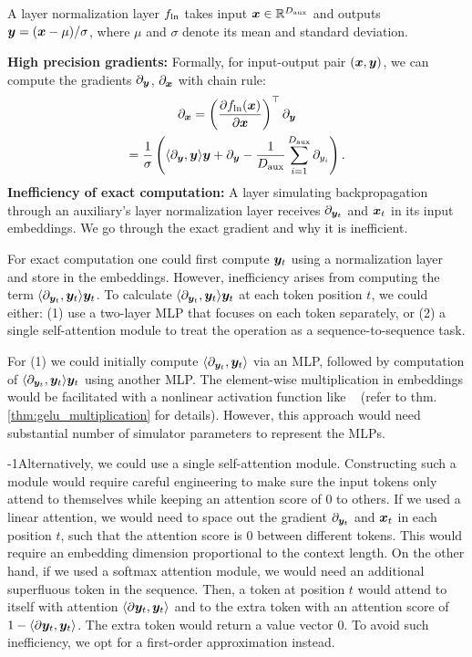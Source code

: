 \begin{definition}
     A layer normalization layer $f_{\text{ln}}$  takes input ${\bm{x}}\in\mathbb{R}^{D_{\text{aux}}}$ and outputs ${\bm{y}} = ({\bm{x}} - \mu) / \sigma$, where $\mu$ and $\sigma$ denote its mean and standard deviation.
\end{definition}
\textbf{High precision gradients:} 
Formally, for input-output pair $({\bm{x}}, {\bm{y}})$, we can compute the  gradients $\partial_{{\bm{y}}}$, $\partial_{{\bm{x}}}$ with  chain rule:
\begin{gather}
    \partial_{{\bm{x}}} = \left(\frac{\partial f_{\text{ln}} ({\bm{x}})}{\partial {\bm{x}}} \right)^{\top} \partial_{{\bm{y}}}  \nonumber \\= \frac{1}{\sigma} \left(  \langle \partial_{{\bm{y}}}, {\bm{y}} \rangle {\bm{y}} + \partial_{{\bm{y}}} - \frac{1}{D_{\text{aux}}} \sum_{i=1}^{D_{\text{aux}}} \partial_{y_i} \right). \label{eq:ln_informal}
\end{gather}
\textbf{Inefficiency of exact computation:} 
A \simulator{} layer simulating backpropagation through an auxiliary's layer normalization layer receives  $\partial_{{{\bm{y}}}_t}$ and ${\bm{x}}_t$ in its input embeddings. We go through the exact gradient and why it is inefficient.

For exact computation one could first compute ${\bm{y}}_t$ using a normalization layer and store in the embeddings. However, inefficiency arises from computing the term  $\langle \partial_{{{{\bm{y}}}_t}}, {\bm{y}}_t \rangle {\bm{y}}_t$.
To calculate $\langle \partial_{{{{\bm{y}}}_t}}, {\bm{y}}_t \rangle {\bm{y}}_t$ at each token position $t$, we could either: (1) use a two-layer MLP that focuses on each token separately, or (2) a single self-attention module to treat the operation as a sequence-to-sequence task. 

For (1) we could initially compute $\langle \partial_{{{\bm{y}}}_t}, {\bm{y}}_t \rangle$ via an MLP, followed by computation of $\langle \partial_{{{\bm{y}}}_t}, {\bm{y}}_t \rangle {\bm{y}}_t$ using another MLP. The element-wise multiplication in embeddings would be facilitated with a nonlinear activation function like \gelu{}~\citep{akyurek2022learning} (refer to thm. \ref{thm:gelu_multiplication} for details). However, this approach would need  substantial number of simulator parameters to represent the MLPs.

\looseness-1Alternatively, we could  use a single self-attention module. Constructing such a module would require careful engineering to make sure the input tokens only attend to themselves while keeping an attention score of $0$ to others. If we used a linear attention, we would need to space out the gradient $\partial_{{{\bm{y}}}_t}$ and ${\bm{x}}_t$ in each position $t$, such that the attention score is $0$ between different tokens. This would require an embedding dimension proportional to the context length. 
On the other hand, if we used a softmax attention module, we would need an additional superfluous token in the sequence. Then, a token at position $t$ would attend to itself with attention $\langle \partial{{\bm{y}}}_t, {\bm{y}}_t\rangle$ and to the extra token with an attention score of $1-\langle \partial{{\bm{y}}}_t, {\bm{y}}_t\rangle$. The extra token would return a value vector $0$.  To avoid such inefficiency, we opt for a first-order approximation instead.


